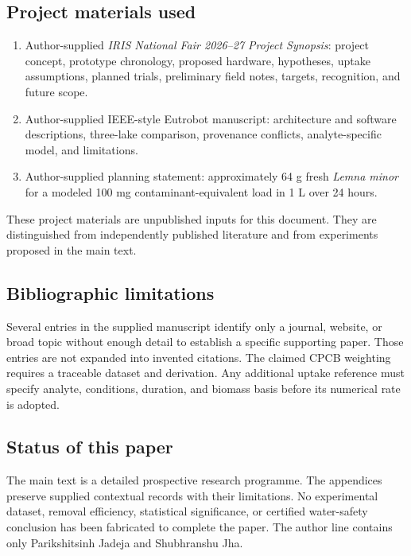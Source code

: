 \documentclass[12pt,a4paper]{article}
\begin{document}
\subsection*{Project materials used}
\begin{enumerate}
\item Author-supplied \emph{IRIS National Fair 2026--27 Project Synopsis}: project concept, prototype chronology, proposed hardware, hypotheses, uptake assumptions, planned trials, preliminary field notes, targets, recognition, and future scope.
\item Author-supplied IEEE-style Eutrobot manuscript: architecture and software descriptions, three-lake comparison, provenance conflicts, analyte-specific model, and limitations.
\item Author-supplied planning statement: approximately 64 g fresh \textit{Lemna minor} for a modeled 100 mg contaminant-equivalent load in 1 L over 24 hours.
\end{enumerate}
These project materials are unpublished inputs for this document. They are distinguished from independently published literature and from experiments proposed in the main text.

\subsection*{Bibliographic limitations}
Several entries in the supplied manuscript identify only a journal, website, or broad topic without enough detail to establish a specific supporting paper. Those entries are not expanded into invented citations. The claimed CPCB weighting requires a traceable dataset and derivation. Any additional uptake reference must specify analyte, conditions, duration, and biomass basis before its numerical rate is adopted.

\subsection*{Status of this paper}
The main text is a detailed prospective research programme. The appendices preserve supplied contextual records with their limitations. No experimental dataset, removal efficiency, statistical significance, or certified water-safety conclusion has been fabricated to complete the paper. The author line contains only Parikshitsinh Jadeja and Shubhranshu Jha.
\end{document}
